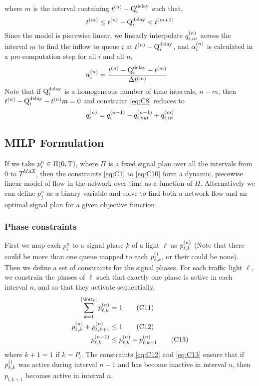 where $m$ is the interval containing $\tn - \QDELAY{i}$ such that, 
\begin{equation}
\tn[m] \le \tn-\QDELAY{i} < \tn[m+1]
\end{equation}
Since the model is piecewise linear, we linearly interpolate $\qin{i}$ across the interval $m$ to find the inflow to queue $i$ at $\tn - \QDELAY{i}$, and $\aph{i}$ is calculated in a pre-computation step for all $i$ and all $n$,
\begin{align}
\aph{i} &= \frac{\tn - \QDELAY{i} - \tn[m]}{\DT[m]}
\end{align}
Note that if $\QDELAY{i}$ is a homogeneous number of time intervals, $n-m$, then $\tn - \QDELAY{i} - \tn{m}=0$ and constraint \ref{eq:C8} reduces to
\begin{equation}
\q{i} = \q[n-1]{i} - \qout[n-1]{i} + \qin[m]{i}
\end{equation}


\subsection{MILP Formulation}
If we take $p_i^n \in \Pi(0,\TMAX)$, where $\Pi$ is a fixed signal plan over all the intervals from 0 to $T^{MAX}$, then the constraints \ref{eq:C1} to \ref{eq:C10} form a dynamic, piecewise linear model of flow in the network over time as a function of $\Pi$. Alternatively we can define $p_j^n$ as a binary variable and solve to find both a network flow and an optimal signal plan for a given objective function.

\subsubsection{Phase constraints}
First we map each $p_i^n$ to a signal phase $k$ of a light $\ell$ as $\p{\ell}{k}$ (Note that there could be more than one queue mapped to each $\p[]{\ell}{k}$, or their could be none). Then we define a set of constraints for the signal phases. For each traffic light $\ell$, we constrain the phases of $\ell$ such that exactly one phase is active in each interval $n$, and so that they activate sequentially,
\begin{align}
\sum\limits_{k=1}^{\Pn} \p{\ell}{k} &= 1\tag{C11}\label{eq:C11}\\
\p{\ell}{k} + \p{\ell}{k+1} &\le 1\tag{C12}\label{eq:C12}\\
\p[n-1]{\ell}{k} &\le \p{\ell}{k} + \p{\ell}{k+1}\tag{C13}\label{eq:C13}
\end{align}
where $k+1=1$ if $k=P_l$. The constraints \ref{eq:C12} and \ref{eq:C13} ensure that if $\p[]{\ell}{k}$ was active during interval $n-1$ and has become inactive in interval $n$, then $p_{l,k+1}$ becomes active in interval $n$.

